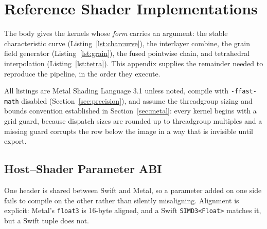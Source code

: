 \section{Reference Shader Implementations}
\label{app:shaders}

The body gives the kernels whose \emph{form} carries an argument: the stable
characteristic curve (Listing~\ref{lst:charcurve}), the interlayer combine, the
grain field generator (Listing~\ref{lst:grain}), the fused pointwise chain, and
tetrahedral interpolation (Listing~\ref{lst:tetra}). This appendix supplies the
remainder needed to reproduce the pipeline, in the order they execute.

All listings are Metal Shading Language 3.1 unless noted, compile with
\texttt{-ffast-math} disabled (Section~\ref{sec:precision}), and assume the
threadgroup sizing and bounds convention established in
Section~\ref{sec:metal}: every kernel begins with a grid guard, because
dispatch sizes are rounded up to threadgroup multiples and a missing guard
corrupts the row below the image in a way that is invisible until export.

\subsection{Host--Shader Parameter ABI}

One header is shared between Swift and Metal, so a parameter added on one side
fails to compile on the other rather than silently misaligning. Alignment is
explicit: Metal's \texttt{float3} is 16-byte aligned, and a Swift
\texttt{SIMD3<Float>} matches it, but a Swift tuple does not.

